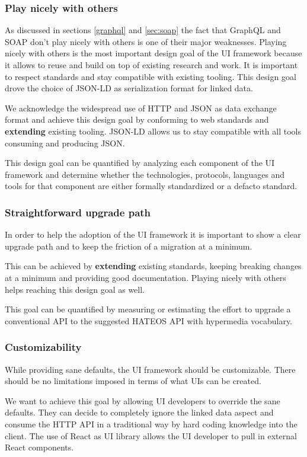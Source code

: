 \subsubsection{Play nicely with others}\label{sec:playnice}
As discussed in sections \ref{graphql} and \ref{sec:soap} the fact that GraphQL and SOAP don't play nicely with others is one of their major weaknesses. Playing nicely with others is the most important design goal of the UI framework because it allows to reuse and build on top of existing research and work.
It is important to respect standards and stay compatible with existing tooling. This design goal drove the choice of JSON-LD as serialization format for linked data.

We acknowledge the widespread use of HTTP and JSON as data exchange format and achieve this design goal by conforming to web standards and \textbf{extending} existing tooling. JSON-LD allows us to stay compatible with all tools consuming and producing JSON.

This design goal can be quantified by analyzing each component of the UI framework and determine whether the technologies, protocols, languages and tools for that component are either formally standardized or a defacto standard.

\subsubsection{Straightforward upgrade path}
In order to help the adoption of the UI framework it is important to show a clear upgrade path and to keep the friction of a migration at a minimum.

This can be achieved by \textbf{extending} existing standards, keeping breaking changes at a minimum and providing good documentation. Playing nicely with others helps reaching this design goal as well.

This goal can be quantified by measuring or estimating the effort to upgrade a conventional API to the suggested HATEOS API with hypermedia vocabulary.

\subsubsection{Customizability}
While providing sane defaults, the UI framework should be customizable. There should be no limitations imposed in terms of what UIs can be created.

We want to achieve this goal by allowing UI developers to override the sane defaults. They can decide to completely ignore the linked data aspect and consume the HTTP API in a traditional way by hard coding knowledge into the client. The use of React as UI library allows the UI developer to pull in external React components.

